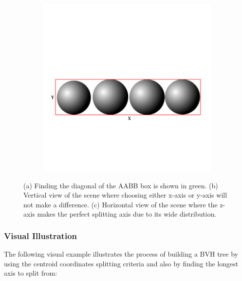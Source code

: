 \documentclass[11pt,a4paper]{article}
\begin{document}
\begin{figure}[H]
\begin{subfigure}[t]{0.3\textwidth}
         \caption{}
         \label{fig:pi_5000}
     \end{subfigure}
     \hfill
     \begin{subfigure}[t]{0.3\textwidth}
         \centering
         \includegraphics[width=\textwidth]{images/LONGAXIS_Z.png}
         \caption{}
         \label{fig:pi_18000}
     \end{subfigure}
        \captionsetup{justification=centering,margin=2cm}
        \caption{(a) Finding the diagonal of the AABB box is shown in green. (b) Vertical view of the scene where choosing either x-axis or y-axis will not make a difference. (c) Horizontal view of the scene where the z-axis makes the perfect splitting axis due to its wide distribution.}
        \label{fig:aabbexample}
\end{figure}

\subsubsection{Visual Illustration}
The following visual example illustrates the process of building a BVH tree by using the centroid coordinates splitting criteria and also by finding the longest axis to split from:
\end{document}
